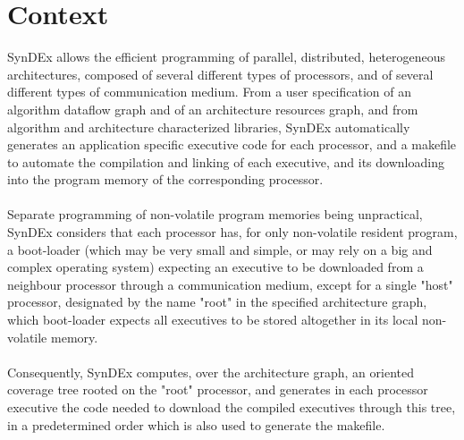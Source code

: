 \documentclass[11pt,twoside]{report}
\begin{document}
\section{Context}
SynDEx allows the efficient programming of parallel, distributed,
heterogeneous architectures, composed of several different types of
processors, and of several different types of communication medium. From
a user specification of an algorithm dataflow graph and of an
architecture resources graph, and from algorithm and architecture
characterized libraries, SynDEx automatically generates an application
specific executive code for each processor, and a makefile to automate
the compilation and linking of each executive, and its downloading into
the program memory of the corresponding processor.\\\\
Separate programming of non-volatile program memories being unpractical,
SynDEx considers that each processor has, for only non-volatile resident
program, a boot-loader (which may be very small and simple, or may rely
on a big and complex operating system) expecting an executive to be
downloaded from a neighbour processor through a communication medium,
except for a single "host" processor, designated by the name "root" in
the specified architecture graph, which boot-loader expects all
executives to be stored altogether in its local non-volatile memory.\\\\
Consequently, SynDEx computes, over the architecture graph, an oriented
coverage tree rooted on the "root" processor, and generates in each
processor executive the code needed to download the compiled executives
through this tree, in a predetermined order which is also used to
generate the makefile.
\end{document}
